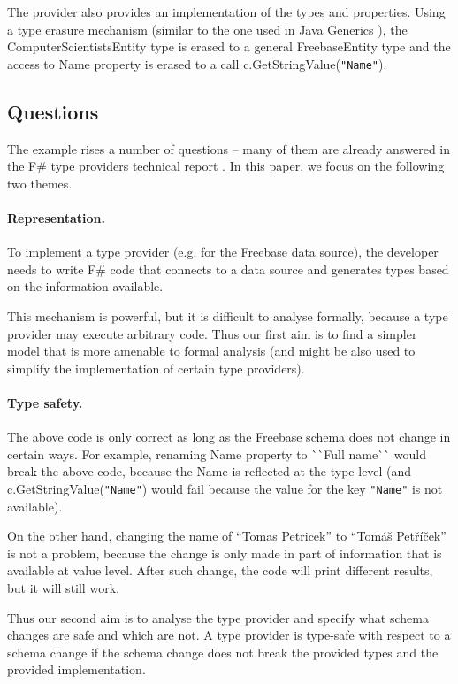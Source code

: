\documentclass[10pt]{sigplanconf}
\newcommand{\ident}[1]{\textnormal{\sffamily #1}}
\newcommand{\fqt}{\`{}\hspace{-0.25em}\`{}}
\begin{document}
The provider also provides an implementation of the types and properties. Using a type erasure mechanism
(similar to the one used in Java Generics \cite{types-java-erasure}), the \ident{ComputerScientistsEntity}
type is erased to a general \ident{FreebaseEntity} type and the access to \ident{Name} property is
erased to a call \ident{c.GetStringValue(\texttt{"Name"})}.

\subsection{Questions}
The example rises a number of questions -- many of them are already answered in the F\# type 
providers technical report \cite{providers-techreport}. In this paper, we focus on the following two
themes.

\paragraph{Representation.} To implement a type provider (e.g. for the Freebase data source), the 
developer needs to write F\# code that connects to a data source and generates types based on the
information available.

This mechanism is powerful, but it is difficult to analyse formally, because a type provider may 
execute arbitrary code. Thus our first aim is to find a simpler model that is more amenable to 
formal analysis (and might be also used to simplify the implementation of certain type providers).

\paragraph{Type safety.} The above code is only correct as long as the Freebase schema does not change in 
certain ways. For example, renaming \ident{Name} property to \ident{\fqt Full name\fqt} would break
the above code, because the \ident{Name} is reflected at the type-level (and 
\ident{c.GetStringValue(\texttt{"Name"})} would fail because the value for the key
\texttt{"Name"} is not available).

On the other hand, changing the name of ``Tomas Petricek'' to ``Tom\'a\v{s} Pet\v{r}\'i\v{c}ek'' is 
not a problem, because the change is only made in part of information that is available at value 
level. After such change, the code will print different results, but it will still work.

Thus our second aim is to analyse the type provider and specify what schema changes are safe
and which are not. A type provider is type-safe with respect to a schema change if the schema
change does not break the provided types and the provided implementation.
\end{document}
